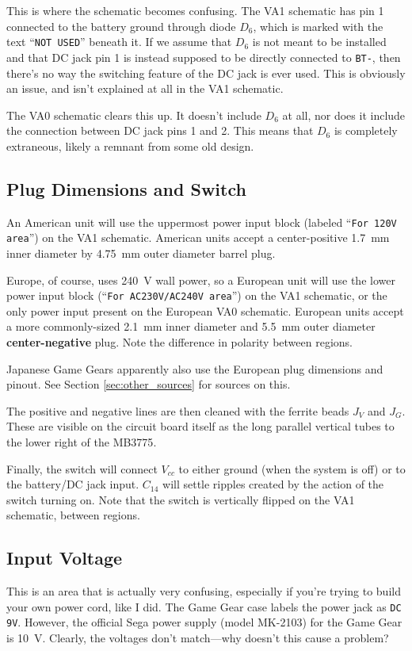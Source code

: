 \documentclass{article}
\newcommand{\Vcc}{$V_{cc}$}
\newcommand{\chippin}{\texttt}
\newcommand{\model}{\textsf}
\begin{document}
This is where the schematic becomes confusing. The \model{VA1}
schematic has pin 1 connected to the battery ground through diode
$D_6$, which is marked with the text ``\texttt{NOT USED}'' beneath
it. If we assume that $D_6$ is not meant to be installed and that DC
jack pin 1 is instead supposed to be directly connected to
\chippin{BT-}, then there's no way the switching feature of the DC
jack is ever used. This is obviously an issue, and isn't explained at
all in the \model{VA1} schematic.

The \model{VA0} schematic clears this up. It doesn't include $D_6$ at
all, nor does it include the connection between DC jack pins 1 and
2. This means that $D_6$ is completely extraneous, likely a remnant
from some old design.

\subsection{Plug Dimensions and Switch}
\label{sec:plug_dimensions}
An American unit will use the uppermost power input block (labeled
``\texttt{For 120V area}'') on the \model{VA1} schematic. American
units accept a center-positive \qty{1.7}{\milli\meter} inner diameter
by \qty{4.75}{\milli\meter} outer diameter barrel plug.

Europe, of course, uses \qty{240}{\volt} wall power, so a European
unit will use the lower power input block (``\texttt{For AC230V/AC240V
  area}'') on the \model{VA1} schematic, or the only power input
present on the European \model{VA0} schematic. European units accept a
more commonly-sized \qty{2.1}{\milli\meter} inner diameter and
\qty{5.5}{\milli\meter} outer diameter \textbf{center-negative}
plug. Note the difference in polarity between regions.

Japanese Game Gears apparently also use the European plug dimensions
and pinout. See Section \ref{sec:other_sources} for sources on this.

The positive and negative lines are then cleaned with the ferrite
beads $J_V$ and $J_G$. These are visible on the circuit board itself
as the long parallel vertical tubes to the lower right of the
\model{MB3775}.

Finally, the switch will connect \Vcc{} to either ground (when the
system is off) or to the battery/DC jack input. $C_{14}$ will settle
ripples created by the action of the switch turning on. Note that the
switch is vertically flipped on the \model{VA1} schematic, between
regions.

\subsection{Input Voltage}
This is an area that is actually very confusing, especially if you're
trying to build your own power cord, like I did. The Game Gear case
labels the power jack as \texttt{DC 9V}. However, the official Sega
power supply (model \model{MK-2103}) for the Game Gear is
\qty{10}{\volt}. Clearly, the voltages don't match---why doesn't this
cause a problem?
\end{document}
